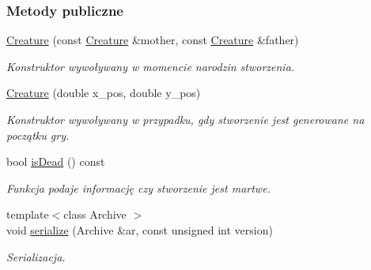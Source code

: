 \subsubsection*{Metody publiczne}
\begin{DoxyCompactItemize}
\item 
\hyperlink{classcommon_1_1Creature_a1aef36038cf8c079ea534175ce34966c}{Creature} (const \hyperlink{classcommon_1_1Creature}{Creature} \&mother, const \hyperlink{classcommon_1_1Creature}{Creature} \&father)
\begin{DoxyCompactList}\small\item\em Konstruktor wywoływany w momencie narodzin stworzenia. \end{DoxyCompactList}\item 
\hyperlink{classcommon_1_1Creature_ac92d5a9bd6bbcc2a78e37278ed335a18}{Creature} (double x\-\_\-pos, double y\-\_\-pos)
\begin{DoxyCompactList}\small\item\em Konstruktor wywoływany w przypadku, gdy stworzenie jest generowane na początku gry. \end{DoxyCompactList}\item 
bool \hyperlink{classcommon_1_1Creature_a604e9f9a6765a8c90eb250be48813ac5}{is\-Dead} () const 
\begin{DoxyCompactList}\small\item\em Funkcja podaje informację czy stworzenie jest martwe. \end{DoxyCompactList}\item 
{\footnotesize template$<$class Archive $>$ }\\void \hyperlink{classcommon_1_1Creature_a975a4df236259ce2d72126c040c5cce0}{serialize} (Archive \&ar, const unsigned int version)
\begin{DoxyCompactList}\small\item\em Serializacja. \end{DoxyCompactList}\end{DoxyCompactItemize}
